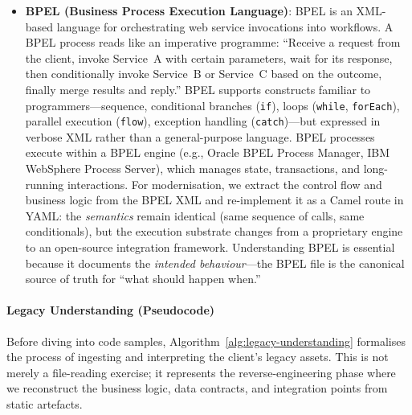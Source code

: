 \documentclass[11pt]{article}
\begin{document}
\begin{itemize}
  \item \textbf{BPEL (Business Process Execution Language)}: BPEL is an XML-based language for orchestrating web service invocations into workflows. A BPEL process reads like an imperative programme: ``Receive a request from the client, invoke Service~A with certain parameters, wait for its response, then conditionally invoke Service~B or Service~C based on the outcome, finally merge results and reply.'' BPEL supports constructs familiar to programmers—sequence, conditional branches (\texttt{if}), loops (\texttt{while}, \texttt{forEach}), parallel execution (\texttt{flow}), exception handling (\texttt{catch})—but expressed in verbose XML rather than a general-purpose language. BPEL processes execute within a BPEL engine (e.g., Oracle BPEL Process Manager, IBM WebSphere Process Server), which manages state, transactions, and long-running interactions. For modernisation, we extract the control flow and business logic from the BPEL XML and re-implement it as a Camel route in YAML: the \emph{semantics} remain identical (same sequence of calls, same conditionals), but the execution substrate changes from a proprietary engine to an open-source integration framework. Understanding BPEL is essential because it documents the \emph{intended behaviour}—the BPEL file is the canonical source of truth for ``what should happen when.''

  \vspace{0.5em}
\noindent{}
  \vspace{0.5em}
\end{itemize}

\paragraph{Legacy Understanding (Pseudocode)}

Before diving into code samples, Algorithm~\ref{alg:legacy-understanding} formalises the process of ingesting and interpreting the client's legacy assets. This is not merely a file-reading exercise; it represents the reverse-engineering phase where we reconstruct the business logic, data contracts, and integration points from static artefacts.
\end{document}
